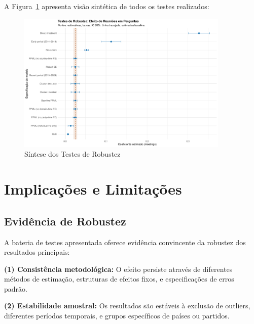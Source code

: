 A Figura~\ref{fig:robustness_overview} apresenta visão sintética de todos os testes realizados:

\begin{figure}[htbp]
    \centering
    \includegraphics[width=0.9\textwidth]{figures/robustness/robustness_coefficients.pdf}
    \caption{Síntese dos Testes de Robustez}
    \label{fig:robustness_overview}
\end{figure}

\section{Implicações e Limitações}

\subsection{Evidência de Robustez}

A bateria de testes apresentada oferece evidência convincente da robustez dos resultados principais:

\textbf{(1) Consistência metodológica:} O efeito persiste através de diferentes métodos de estimação, estruturas de efeitos fixos, e especificações de erros padrão.

\textbf{(2) Estabilidade amostral:} Os resultados são estáveis à exclusão de outliers, diferentes períodos temporais, e grupos específicos de países ou partidos.

